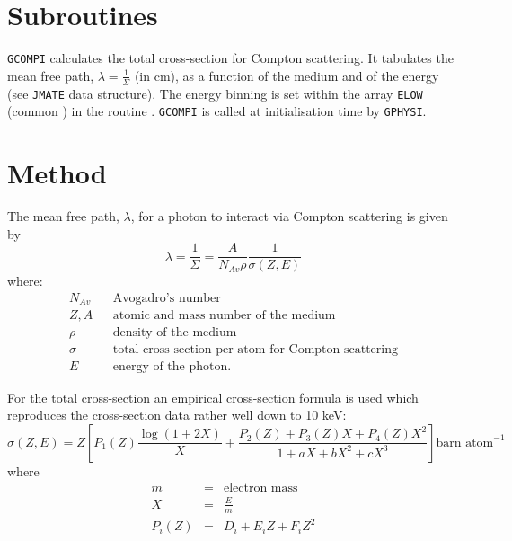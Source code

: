 
\section{Subroutines} 
 
{\tt GCOMPI} calculates the total cross-section for Compton
scattering. It tabulates the mean free path, $\lambda =
\frac{1}{\Sigma}$ (in cm), as a function
of the medium and of the energy (see {\tt JMATE} data structure).
The energy binning is set within the array {\tt ELOW} (common
) in the routine .
{\tt GCOMPI} is called at initialisation time by {\tt GPHYSI}.
 
\section{Method}
 
The mean free path, $\lambda$, for a photon to interact via Compton
scattering is given by
\[
\lambda = \frac{1}{\Sigma} = \frac{A}{N_{Av}\rho}\frac{1}{\sigma(Z,E)}
\]
where:
\begin{eqnarray*}
N_{Av} &  & \mbox{Avogadro's number} \\
Z,A &  & \mbox{atomic and mass number of the medium} \\
\rho &  & \mbox{density of the medium} \\
\sigma &  & \mbox{total cross-section per atom for Compton scattering} \\
E &  & \mbox{energy of the photon.}
\end{eqnarray*}
 
For the total cross-section an empirical cross-section formula
is used which reproduces the cross-section data rather well down to 10 keV:
\[
\sigma(Z,E) = Z \left [ P_{1}(Z) \frac{\log(1+2X)}{X} +
\frac{P_{2}(Z)+P_{3}(Z) X + P_{4}(Z) X^{2}}{1+aX+bX^{2}+cX^{3}} \right ]
\mbox{barn atom}^{-1} 
\]
where
\begin{eqnarray*}
m & = & \mbox{electron mass}  \\
X & = & \frac{E}{m}  \\
P_{i}(Z) & = & D_{i} + E_{i}Z + F_{i}Z^{2}
\end{eqnarray*}
 
